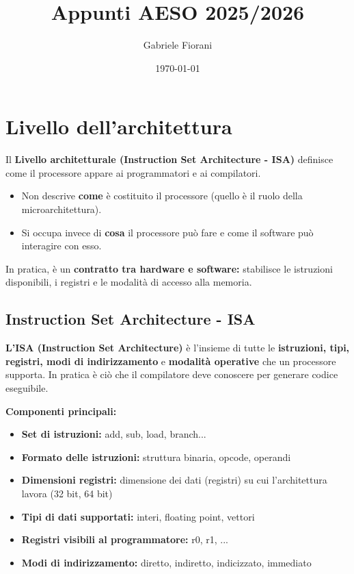 \documentclass[8pt]{article}
\title{Appunti AESO 2025/2026}
\author{Gabriele Fiorani}
\date{\today}
\begin{document}
\maketitle

\section{\LARGE Livello dell'architettura}

Il \textbf{Livello architetturale (Instruction Set Architecture - ISA)} definisce come il processore appare ai programmatori e ai compilatori.

\begin{itemize}[left=1em, itemsep=0.5em]
    \item Non descrive \textbf{come} è costituito il processore (quello è il ruolo della microarchitettura).
    \item Si occupa invece di \textbf{cosa} il processore può fare e come il software può interagire con esso.
\end{itemize}

\noindent In pratica, è un \textbf{contratto tra hardware e software:} stabilisce le istruzioni disponibili, i registri e le modalità di accesso alla memoria.

\subsection{\Large Instruction Set Architecture - ISA}

\vspace{0.2cm}
\textbf{L'ISA (Instruction Set Architecture)} è l'insieme di tutte le \textbf{istruzioni, tipi, registri, modi di indirizzamento} e  \textbf{modalità operative} che un processore supporta. In pratica è ciò che il compilatore deve conoscere per generare codice eseguibile.

\vspace{0.5cm}  
\noindent \textbf{Componenti principali:}

\begin{itemize}[left=1em, itemsep=0.5em]
    \item \textbf{Set di istruzioni:} add, sub, load, branch...
    \item \textbf{Formato delle istruzioni:} struttura binaria, opcode, operandi
    \item \textbf{Dimensioni registri:} dimensione dei dati (registri) su cui l'architettura lavora (32 bit, 64 bit)
    \item \textbf{Tipi di dati supportati:} interi, floating point, vettori
    \item \textbf{Registri visibili al programmatore:} r0, r1, ...
    \item \textbf{Modi di indirizzamento:} diretto, indiretto, indicizzato, immediato
\end{itemize}
\end{document}
